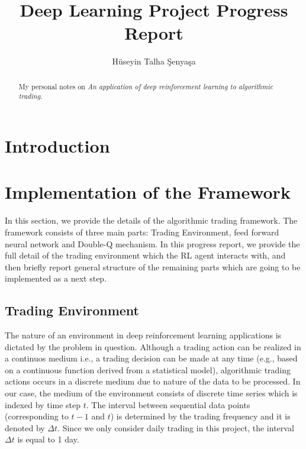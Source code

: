 \documentclass[twocolumn,aps,pra,superscriptaddress,nofootinbib,longbibliography]{revtex4-2}
\begin{document}
\title{Deep Learning Project Progress Report}

\author{H\"useyin Talha \c{S}enya\c{s}a}






\begin{abstract}
My personal notes on \textit{An application of deep reinforcement learning to algorithmic trading}.

\end{abstract}

\maketitle



\section{Introduction}

\section{Implementation of the Framework}

In this section, we provide the details of the algorithmic trading framework. The framework consists of three main parts: Trading Environment, feed forward neural network and Double-Q mechanism. In this progress report, we provide the full detail of the trading environment which the RL agent interacts with, and then briefly report general structure of the remaining parts which are going to be implemented as a next step. 
 

\subsection{Trading Environment}

The nature of an environment in deep reinforcement learning applications is dictated by the problem in question. Although a trading action can be realized in a continuos medium i.e., a trading decision can be made at any time (e.g., based on a continuous function derived from a statistical model), algorithmic trading actions occurs in a discrete medium due to nature of the data to be processed.  In our case, the medium of the environment consists of discrete time series which is indexed by time step \(t\). The interval between sequential data points (corresponding to \(t-1\) and \(t\)) is determined by the trading frequency and it is denoted by \(\Delta t\). Since we only consider daily trading in this project, the interval \(\Delta t\) is equal to 1 day. 
\end{document}
